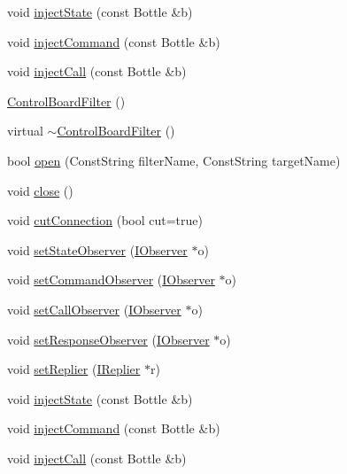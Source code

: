 \begin{DoxyCompactItemize}
\item 
void \hyperlink{classyarp_1_1os_1_1_control_board_filter_a379021d871cc1d375d8ea2107b74911d}{injectState} (const Bottle \&b)
\item 
void \hyperlink{classyarp_1_1os_1_1_control_board_filter_a329bcebdddb5afbd7a5e7303e6941311}{injectCommand} (const Bottle \&b)
\item 
void \hyperlink{classyarp_1_1os_1_1_control_board_filter_a46da5eabf941da5694107bf2d4adc075}{injectCall} (const Bottle \&b)
\item 
\hyperlink{classyarp_1_1os_1_1_control_board_filter_a7bbad9a004ca2a98836aad0bf2c61a7e}{ControlBoardFilter} ()
\item 
virtual \hyperlink{classyarp_1_1os_1_1_control_board_filter_a137af6adba9f24aea3bcf274332dbff9}{$\sim$ControlBoardFilter} ()
\item 
bool \hyperlink{classyarp_1_1os_1_1_control_board_filter_a333ebfc5235d2e8dcf6e226a1d00924b}{open} (ConstString filterName, ConstString targetName)
\item 
void \hyperlink{classyarp_1_1os_1_1_control_board_filter_acb354b5aea9ec25a99aa57ce4781b56d}{close} ()
\item 
void \hyperlink{classyarp_1_1os_1_1_control_board_filter_a7d49e4c935446a6523f9504510d556c6}{cutConnection} (bool cut=true)
\item 
void \hyperlink{classyarp_1_1os_1_1_control_board_filter_a17305fdd2e2f51d790e5787245471eb9}{setStateObserver} (\hyperlink{classyarp_1_1os_1_1_i_observer}{IObserver} $\ast$o)
\item 
void \hyperlink{classyarp_1_1os_1_1_control_board_filter_af40e1e2c791dcbe740e480a257db76b4}{setCommandObserver} (\hyperlink{classyarp_1_1os_1_1_i_observer}{IObserver} $\ast$o)
\item 
void \hyperlink{classyarp_1_1os_1_1_control_board_filter_a534651daebaa7a8324ee8749aeba2469}{setCallObserver} (\hyperlink{classyarp_1_1os_1_1_i_observer}{IObserver} $\ast$o)
\item 
void \hyperlink{classyarp_1_1os_1_1_control_board_filter_a9e6db13ba589309cfca6667735c29297}{setResponseObserver} (\hyperlink{classyarp_1_1os_1_1_i_observer}{IObserver} $\ast$o)
\item 
void \hyperlink{classyarp_1_1os_1_1_control_board_filter_a67e1c7b532ab58bb42f7c20ec2d5d2ce}{setReplier} (\hyperlink{classyarp_1_1os_1_1_i_replier}{IReplier} $\ast$r)
\item 
void \hyperlink{classyarp_1_1os_1_1_control_board_filter_a3386103cf773f04fb16fb451b8e301fe}{injectState} (const Bottle \&b)
\item 
void \hyperlink{classyarp_1_1os_1_1_control_board_filter_a8fcab8021e1d19529dd6de96312f9ce6}{injectCommand} (const Bottle \&b)
\item 
void \hyperlink{classyarp_1_1os_1_1_control_board_filter_ab78bfa155e19e516ec6cf7cb39b3d8ac}{injectCall} (const Bottle \&b)
\end{DoxyCompactItemize}


